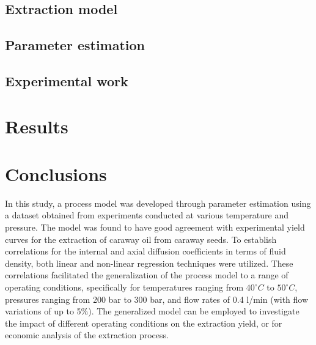 \documentclass[a4paper,fleqn]{cas-dc}
\begin{document}
\subsection{Extraction model} \label{CH: Extraction_model}


%

\subsection{Parameter estimation} \label{CH: Parameter_estimation}


\subsection{Experimental work}


\section{Results}


\section{Conclusions} \label{CH: Conclusion}
In this study, a process model was developed through parameter estimation using a dataset obtained from experiments conducted at various temperature and pressure. The model was found to have good agreement with experimental yield curves for the extraction of caraway oil from caraway seeds. To establish correlations for the internal and axial diffusion coefficients in terms of fluid density, both linear and non-linear regression techniques were utilized. These correlations facilitated the generalization of the process model to a range of operating conditions, specifically for temperatures ranging from $40^\circ C$ to $50^\circ C$, pressures ranging from 200 bar to 300 bar, and flow rates of 0.4 l/min (with flow variations of up to 5\%). The generalized model can be employed to investigate the impact of different operating conditions on the extraction yield, or for economic analysis of the extraction process.

\clearpage
%


\end{document}
